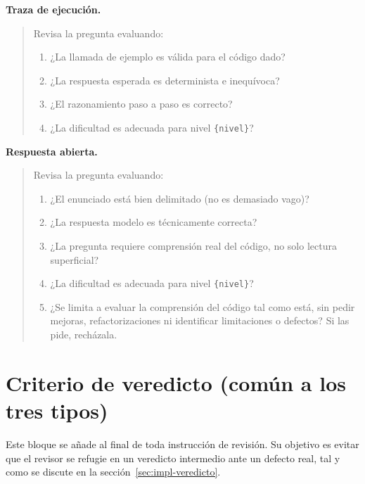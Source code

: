 \textbf{Traza de ejecución.}

\begin{quote}\small
Revisa la pregunta evaluando:
\begin{enumerate}
  \item ¿La llamada de ejemplo es válida para el código dado?
  \item ¿La respuesta esperada es determinista e inequívoca?
  \item ¿El razonamiento paso a paso es correcto?
  \item ¿La dificultad es adecuada para nivel \texttt{\{nivel\}}?
\end{enumerate}
\end{quote}

\textbf{Respuesta abierta.}

\begin{quote}\small
Revisa la pregunta evaluando:
\begin{enumerate}
  \item ¿El enunciado está bien delimitado (no es demasiado vago)?
  \item ¿La respuesta modelo es técnicamente correcta?
  \item ¿La pregunta requiere comprensión real del código, no solo lectura
        superficial?
  \item ¿La dificultad es adecuada para nivel \texttt{\{nivel\}}?
  \item ¿Se limita a evaluar la comprensión del código tal como está, sin pedir
        mejoras, refactorizaciones ni identificar limitaciones o defectos? Si
        las pide, recházala.
\end{enumerate}
\end{quote}


\section{Criterio de veredicto (común a los tres tipos)}
\label{sec:anexo-veredicto}

Este bloque se añade al final de toda instrucción de revisión. Su objetivo es
evitar que el revisor se refugie en un veredicto intermedio ante un defecto
real, tal y como se discute en la sección~\ref{sec:impl-veredicto}.

